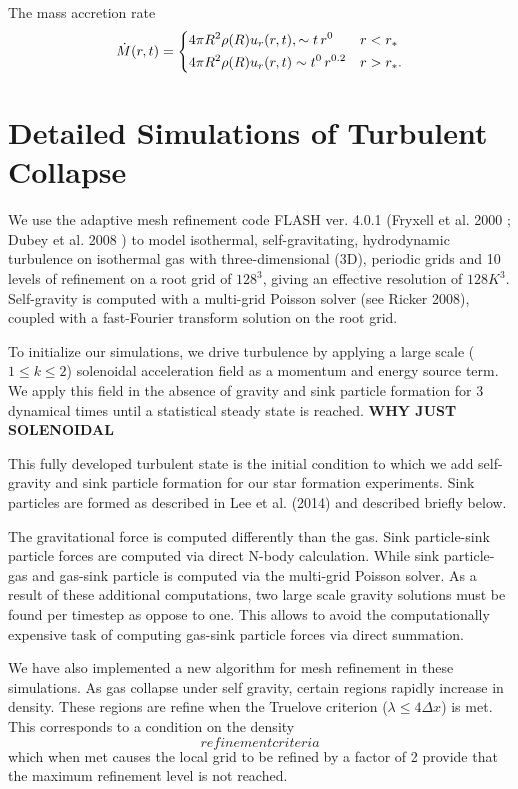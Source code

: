 \documentclass{emulateapj}
\newcommand{\be}{\begin{equation}}
\newcommand{\ee}{\end{equation}}
\begin{document}
The mass accretion rate 
%
\be
\dot M(r,t)=
\begin{dcases}
4\pi R^2\rho(R)u_r(r,t), \sim t\,r^{0} & r<r_*\\
4\pi R^2\rho(R)u_r(r,t) \sim t^0\,r^{0.2} & r>r_*.
\end{dcases}
\ee
%


\section{Detailed Simulations of Turbulent Collapse}

We use the adaptive mesh refinement code FLASH ver. 4.0.1 (Fryxell et al.
2000
; Dubey
et al.
2008
) to model isothermal, self-gravitating, hydrodynamic turbulence on isothermal gas with three-dimensional (3D),
periodic grids and 10 levels of refinement on a root grid of $128^3$, giving an effective resolution of $128K^3$.  
Self-gravity is computed with a multi-grid Poisson solver (see Ricker
2008), coupled with a fast-Fourier transform solution on the root grid.

To initialize our simulations, we drive turbulence by applying a large scale ($1 \le k \le 2$) solenoidal 
acceleration field as a momentum and energy source term.  We apply this field in the absence of gravity and sink particle formation for 3 dynamical times until a statistical steady state is reached.
{\bf WHY JUST SOLENOIDAL}

This fully developed turbulent state is the initial condition to which we add self-gravity and sink particle formation for
our star formation experiments. Sink particles are formed as described in Lee et al. (2014) and described briefly below.  

The gravitational force is computed differently than the gas. Sink particle-sink particle forces are computed via direct N-body calculation. While sink particle-gas and gas-sink particle is computed via the multi-grid Poisson solver.  As a result of these additional computations, two large scale gravity solutions must be found per timestep as oppose to one.  This allows to avoid the computationally expensive task of computing gas-sink particle forces via direct summation. 

We have also implemented a new algorithm for mesh refinement in these simulations.  As gas collapse under self gravity, certain regions rapidly increase in density.  These regions are refine when the Truelove criterion ($\lambda \le 4 \Delta x$) is met. This corresponds to a condition on the density 
\begin{equation}
refinement criteria
\end{equation}
which when met causes the local grid to be refined by a factor of 2 provide that the maximum refinement level is not reached.
\end{document}
